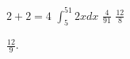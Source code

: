 \documentclass[11pt]{article}
\begin{document}
\(2 + 2 = 4\)
\(\int_5^{51}2x dx\)
\(\frac{4}{91}\)
\(\frac{12}{8}\)

\(\frac{12}{9}\).
\end{document}
